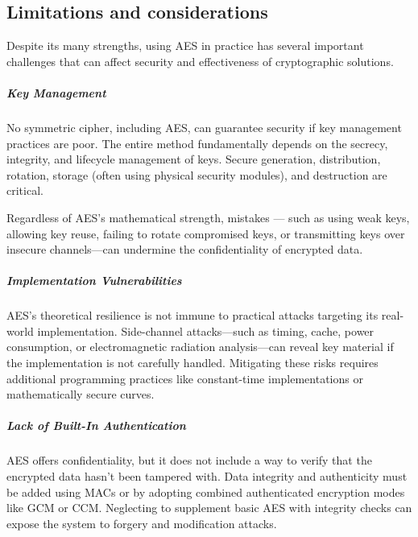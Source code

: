 \subsection{Limitations and considerations}

Despite its many strengths, using AES in practice has several important challenges that can affect security 
and effectiveness of cryptographic solutions.

\subparagraph{Key Management}

No symmetric cipher, including AES, can guarantee security if key management practices are poor. The entire 
method fundamentally depends on the secrecy, integrity, and lifecycle management of keys. Secure generation, 
distribution, rotation, storage (often using physical security modules), and destruction are critical.

Regardless of AES's mathematical strength, mistakes — such as using weak keys, allowing key reuse, failing to 
rotate compromised keys, or transmitting keys over insecure channels—can undermine the confidentiality of 
encrypted data.

\subparagraph{Implementation Vulnerabilities}

AES's theoretical resilience is not immune to practical attacks targeting its real-world implementation. 
Side-channel attacks—such as timing, cache, power consumption, or electromagnetic radiation analysis—can 
reveal key material if the implementation is not carefully handled. Mitigating these risks requires additional 
programming practices like constant-time implementations or mathematically secure curves.

\subparagraph{Lack of Built-In Authentication}
AES offers confidentiality, but it does not include a way to verify that the encrypted data hasn't been tampered 
with. Data integrity and authenticity must be added using MACs or by adopting combined authenticated encryption 
modes like GCM or CCM. Neglecting to supplement basic AES with integrity checks can expose the system to forgery 
and modification attacks.